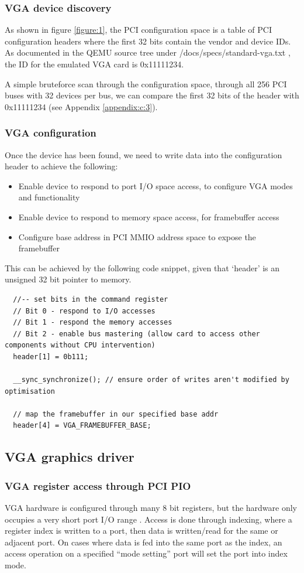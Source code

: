 \subsubsection{VGA device discovery}
As shown in figure \ref{figure:1}, the PCI configuration space is a table of PCI configuration headers
where the first 32 bits contain the vendor and device IDs. As documented in the QEMU source tree under
/docs/specs/standard-vga.txt \cite{qemusource}, the ID for the emulated VGA card is 0x11111234.

A simple bruteforce scan through the configuration space, through all 256 PCI buses with 32 devices
per bus, we can compare the first 32 bits of the header with 0x11111234 (see Appendix \ref{appendix:c:3}).

\subsubsection{VGA configuration}
Once the device has been found, we need to write data into the configuration header to achieve the following:
\begin{itemize}
    \item Enable device to respond to port I/O space access, to configure VGA modes and functionality
    \item Enable device to respond to memory space access, for framebuffer access
    \item Configure base address in PCI MMIO address space to expose the framebuffer
\end{itemize}
This can be achieved by the following code snippet, given that `header' is an unsigned 32 bit
pointer to memory.
\begin{verbatim}
  //-- set bits in the command register
  // Bit 0 - respond to I/O accesses
  // Bit 1 - respond the memory accesses
  // Bit 2 - enable bus mastering (allow card to access other components without CPU intervention)
  header[1] = 0b111;

  __sync_synchronize(); // ensure order of writes aren't modified by optimisation

  // map the framebuffer in our specified base addr
  header[4] = VGA_FRAMEBUFFER_BASE;
\end{verbatim}

\subsection{VGA graphics driver}
\label{chapter2:impl:driver}
\subsubsection{VGA register access through PCI PIO}
VGA hardware is configured through many 8 bit registers, but the hardware only occupies
a very short port I/O range \cite{osdevvga}. Access is done through indexing, where a register
index is written to a port, then data is written/read for the same or adjacent port. On cases
where data is fed into the same port as the index, an access operation on a specified ``mode setting'' port
will set the port into index mode.

